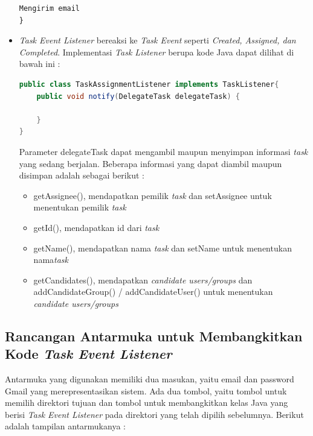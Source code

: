 \begin{itemize}
\begin{lstlisting}[basicstyle=\tiny,caption=Pseudocode TaskAssignmentListener]
	Mengirim email
}

\end{lstlisting}

\item \textit{Task Event Listener} bereaksi ke \textit{Task Event} seperti \textit{Created, Assigned, dan Completed}. Implementasi \textit{Task Listener} berupa kode Java dapat dilihat di bawah ini :
\begin{lstlisting}[language=Java,basicstyle=\tiny,caption=TaskAssignmentListener.java]
public class TaskAssignmentListener implements TaskListener{
	public void notify(DelegateTask delegateTask) {
	
	}
}
\end{lstlisting}

Parameter delegateTask dapat mengambil maupun menyimpan informasi \textit{task} yang sedang berjalan. Beberapa informasi yang dapat diambil maupun disimpan adalah sebagai berikut :
\begin{itemize}
	\item getAssignee(), mendapatkan pemilik \textit{task} dan setAssignee untuk menentukan pemilik \textit{task}
	\item getId(), mendapatkan id dari \textit{task}
	\item getName(), mendapatkan nama \textit{task} dan setName untuk menentukan nama\textit{task}
	\item getCandidates(), mendapatkan \textit{candidate users/groups} dan addCandidateGroup() / addCandidateUser() untuk menentukan \textit{candidate users/groups}
	
\end{itemize}
\end{itemize}

\subsection{Rancangan Antarmuka untuk Membangkitkan Kode \textit{Task Event Listener}}
\label{sec:perancangansistem_antarmuka}
Antarmuka yang digunakan memiliki dua masukan, yaitu email dan password Gmail yang merepresentasikan sistem. Ada dua tombol, yaitu tombol untuk memilih direktori tujuan dan tombol untuk membangkitkan kelas Java yang berisi \textit{Task Event Listener} pada direktori yang telah dipilih sebelumnya. Berikut adalah tampilan antarmukanya :

